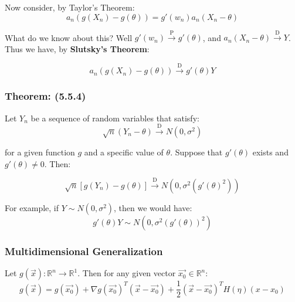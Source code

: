 \documentclass{article}
\begin{document}
   \noindent Now consider, by Taylor's Theorem:
    \begin{equation*}
        a_n(g(X_n) - g(\theta)) = g'(w_n) a_n (X_n - \theta)
    \end{equation*}
    
    \noindent What do we know about this? Well $g'(w_n) \xrightarrow{\text{P}} g'(\theta)$, and $a_n(X_n-\theta) \xrightarrow{\text{D}} Y$. Thus we have, by \textbf{Slutsky's Theorem}:
    
    \begin{equation*}
        a_n(g(X_n) - g(\theta)) \xrightarrow{\text{D}} g'(\theta)Y
    \end{equation*}
    
    \subsubsection*{Theorem: (5.5.4)} Let $Y_n$ be a sequence of random variables that satisfy:
    \begin{equation*}
        \sqrt{n}(Y_n-\theta) \xrightarrow{\text{D}} N(0,\sigma^2)
    \end{equation*}
    
    \noindent for a given function $g$ and a specific value of $\theta$. Suppose that $g'(\theta)$ exists and $g'(\theta) \neq 0$. Then:
    
    \begin{equation*}
        \sqrt{n}[g(Y_n) - g(\theta)] \xrightarrow{\text{D}} N\left(0,\sigma^2\left(g'(\theta)^2 \right)\right)
    \end{equation*}
    
    For example, if $Y \sim N(0,\sigma^2)$, then we would have:
    \begin{equation*}
        g'(\theta)Y \sim N(0,\sigma^2 (g'(\theta))^2)
    \end{equation*}
    
    \subsubsection{Multidimensional Generalization}
    
    Let $g(\vec{x}): \mathbb{R}^n \rightarrow \mathbb{R}^1$. Then for any given vector $\vec{x_0} \in \mathbb{R}^n$:
    \begin{equation*}
        g(\vec{x}) = g(\vec{x_0}) + \nabla g(\vec{x_0})^T (\vec{x}-\vec{x_0}) + \frac{1}{2}(\vec{x}-\vec{x_0})^T H(\eta)(x-x_0)
    \end{equation*}
    
\end{document}
